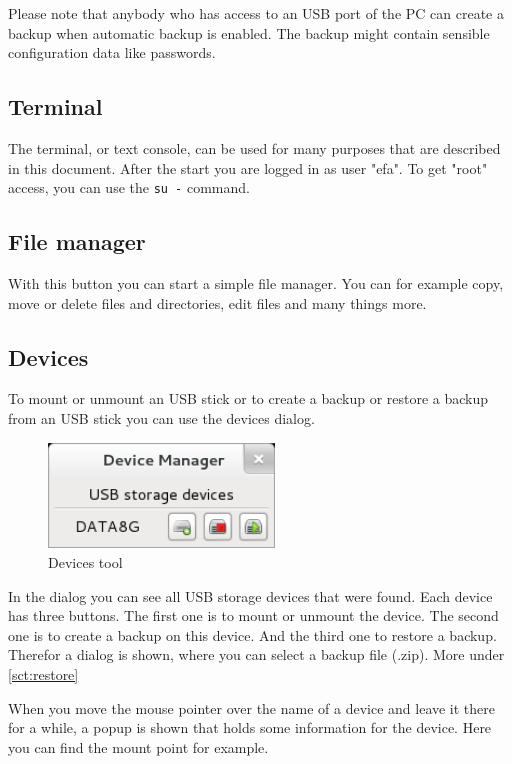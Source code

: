 \documentclass[a4paper,12pt,twoside]{article}
\begin{document}
Please note that anybody who has access to an USB port of the PC can
create a backup when automatic backup is enabled. The backup might
contain sensible configuration data like passwords.


\subsection{Terminal}
\label{sct:terminal}
The terminal, or text console, can be used for many purposes that are
described in this document. After the start you are logged in as user
"efa". To get "root" access, you can use the \texttt{su -} command.


\subsection{File manager}
\label{sct:file_manager}
With this button you can start a simple file manager. You can for
example copy, move or delete files and directories, edit files and many
things more.

\subsection{Devices}
\label{sct:dialog_devices}
To mount or unmount an USB stick or
to create a backup or restore a backup from an USB stick you can use
the devices dialog.

\begin{figure}
    \centering
    \includegraphics[width=6cm]{efaLiveen-img/efaLiveen-img21.png}
    \caption{Devices tool}
    \label{fig:dialog_devices}
\end{figure}

In the dialog you can see all USB storage devices that were found. Each
device has three buttons. The first one is to mount or unmount the
device. The second one is to create a backup on this device. And the
third one to restore a backup. Therefor a dialog is shown, where you
can select a backup file (.zip). More under \ref{sct:restore}

When you move the mouse pointer over the name of a device and leave it
there for a while, a popup is shown that holds some information for the
device. Here you can find the mount point for example.
\end{document}
